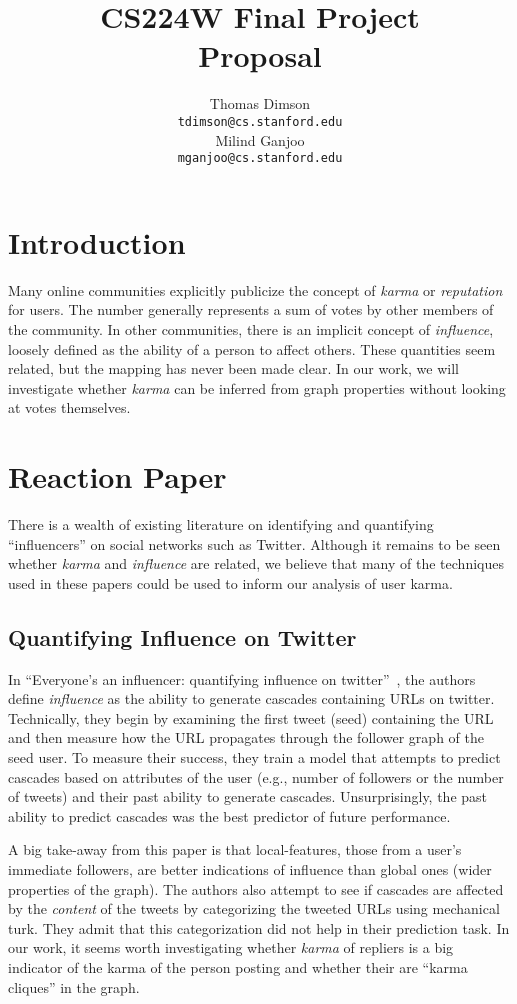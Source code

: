 \documentclass[11pt]{article}
\title{{\small CS224W Final Project} \\ Proposal}
\author{Thomas Dimson \\
  {\tt tdimson@cs.stanford.edu}
  \\\And
  Milind Ganjoo \\
  {\tt mganjoo@cs.stanford.edu}
}
\date{}
\newcommand{\titlecite}[2]{``#1''~\cite{#2}}
\begin{document}
\maketitle

\section{Introduction}
Many online communities explicitly publicize the concept of \textit{karma} or
\textit{reputation} for users. The number generally represents a sum of votes 
by other members of the community. In other communities, there is an implicit concept
of \textit{influence}, loosely defined as the ability of a person to affect 
others. These quantities seem related, but the mapping has never been made clear. In our work,
we will investigate whether \textit{karma} can be inferred from graph properties without
looking at votes themselves.

\section{Reaction Paper}
There is a wealth of existing literature on identifying and quantifying ``influencers''
on social networks such as Twitter. Although it remains to be seen whether \textit{karma} and
\textit{influence} are related, we believe that many of the techniques used in these papers
could be used to inform our analysis of user karma.

\subsection{Quantifying Influence on Twitter}
In \titlecite{Everyone's an influencer: quantifying influence on twitter}{bakshy2011everyone}, 
the authors define \textit{influence} as the ability to generate cascades containing
URLs on twitter. Technically, they begin by examining the first tweet (seed) containing the URL and
then measure how the URL propagates through the follower graph of the seed user. To measure their
success, they train a model that attempts to predict cascades based on attributes of the user
(e.g., number of followers or the number of tweets) and their past ability to generate cascades.
Unsurprisingly, the past ability to predict cascades was the best predictor of future performance.

A big take-away from this paper is that local-features, those from a user's immediate followers,
are better indications of influence than global ones (wider properties of the graph). The authors
also attempt to see if cascades are affected by the \textit{content} of the tweets by categorizing the 
tweeted URLs using mechanical turk. They admit that this categorization did not help in their
prediction task. In our work,
it seems worth investigating whether \textit{karma} of repliers is a big indicator of the karma
of the person posting and whether their are ``karma cliques'' in the graph. 
\end{document}
